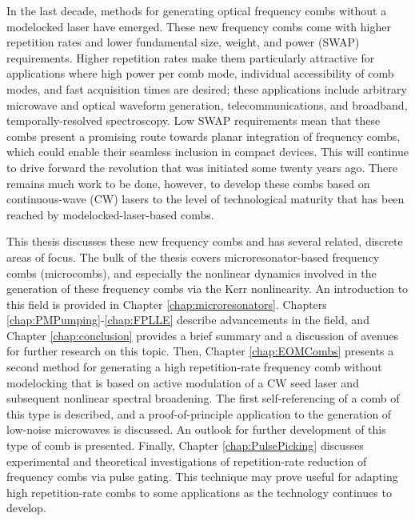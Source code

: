 In the last decade, methods for generating optical frequency combs without a modelocked laser have emerged. These new frequency combs come with higher repetition rates and lower fundamental size, weight, and power (SWAP) requirements. Higher repetition rates make them particularly attractive for applications where high power per comb mode, individual accessibility of comb modes, and fast acquisition times are desired; these applications include arbitrary microwave and optical waveform generation, telecommunications, and broadband, temporally-resolved spectroscopy. Low SWAP requirements mean that these combs present a promising route towards planar integration of frequency combs, which could enable their seamless inclusion in compact devices. This will continue to drive forward the revolution that was initiated some twenty years ago. There remains much work to be done, however, to develop these combs based on continuous-wave (CW) lasers to the level of technological maturity that has been reached by modelocked-laser-based combs.




This thesis discusses these new frequency combs and has several related, discrete areas of focus. The bulk of the thesis covers microresonator-based frequency combs (microcombs), and especially the nonlinear dynamics involved in the generation of these frequency combs via the Kerr nonlinearity. An introduction to this field is provided in Chapter \ref{chap:microresonators}. Chapters \ref{chap:PMPumping}-\ref{chap:FPLLE} describe advancements in the field, and Chapter \ref{chap:conclusion} provides a brief summary and a discussion of avenues for further research on this topic. Then, Chapter \ref{chap:EOMCombs} presents a second method for generating a high repetition-rate frequency comb without modelocking that is based on active modulation of a CW seed laser and subsequent nonlinear spectral broadening. The first self-referencing of a comb of this type is described, and a proof-of-principle application to the generation of low-noise microwaves is discussed. An outlook for further development of this type of comb is presented. Finally, Chapter \ref{chap:PulsePicking} discusses experimental and theoretical investigations of repetition-rate reduction of frequency combs via pulse gating. This technique may prove useful for adapting high repetition-rate combs to some applications as the technology continues to develop. 


